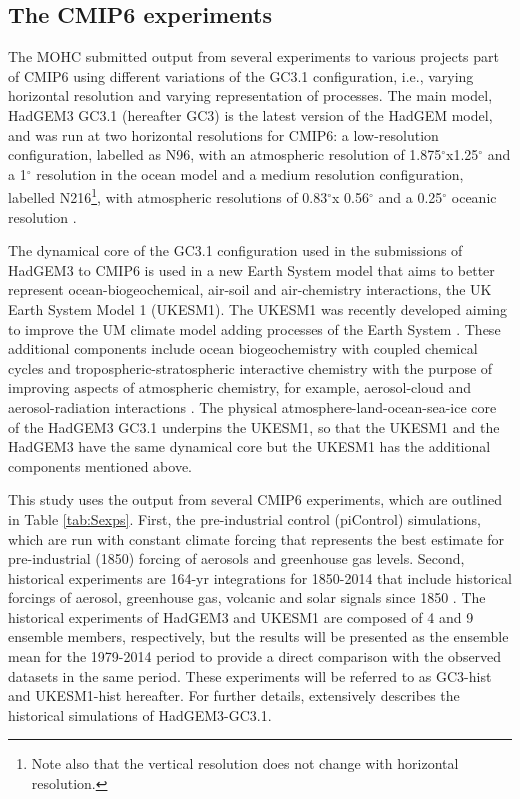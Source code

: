 \subsection{The CMIP6 experiments}\label{sq:cmip6exp}

The MOHC submitted output from several experiments to various projects part of CMIP6 using different variations of the GC3.1 configuration, i.e., varying horizontal resolution and varying representation of processes. 
The main model, HadGEM3 GC3.1 (hereafter GC3) is the latest version of the HadGEM model, and was run at two horizontal resolutions for CMIP6: a low-resolution configuration, labelled as N96, with an atmospheric resolution of 1.875$^\circ$x1.25$^\circ$ and a 1$^\circ$ resolution in the ocean model and a medium resolution configuration, labelled N216\footnote{Note also that the vertical resolution does not change with horizontal resolution. }, with atmospheric resolutions of 0.83$^\circ$x 0.56$^\circ$ and a 0.25$^\circ$ oceanic resolution \citep{menary2018}. 

The dynamical core of the GC3.1 configuration used in the submissions of HadGEM3 to CMIP6 is used in a new Earth System model that aims to better represent ocean-biogeochemical, air-soil and air-chemistry interactions, the UK Earth System Model 1 (UKESM1). 
The UKESM1 was recently developed aiming to improve the UM climate model adding processes of the Earth System \citep{sellar2019}. These additional components include ocean biogeochemistry with coupled chemical cycles and tropospheric-stratospheric interactive chemistry with the purpose of improving aspects of atmospheric chemistry, for example, aerosol-cloud and aerosol-radiation interactions \citep{mulcahy2018,sellar2019}.
The physical atmosphere-land-ocean-sea-ice core of the HadGEM3 GC3.1 underpins the UKESM1, so that the UKESM1 and the HadGEM3 have the same dynamical core but the UKESM1 has the additional components mentioned above.



This study uses the output from several CMIP6 experiments, which are outlined in Table \ref{tab:Sexps}. First, the pre-industrial control (piControl) simulations, which are run with constant climate forcing that represents the best estimate for pre-industrial (1850) forcing of aerosols and greenhouse gas levels. Second, historical experiments are 164-yr integrations for 1850-2014 that include historical forcings of aerosol, greenhouse gas, volcanic and solar signals since 1850 \citep{eyring2016,andrews2019}. 
The historical experiments of HadGEM3 and UKESM1 are composed of 4 and 9 ensemble members, respectively, but the results will be presented as the ensemble mean for the 1979-2014 period to provide a direct comparison with the observed datasets in the same period.
These experiments will be referred to as GC3-hist and UKESM1-hist hereafter.
For further details, \cite{andrews2020} extensively describes the historical simulations of HadGEM3-GC3.1. %


